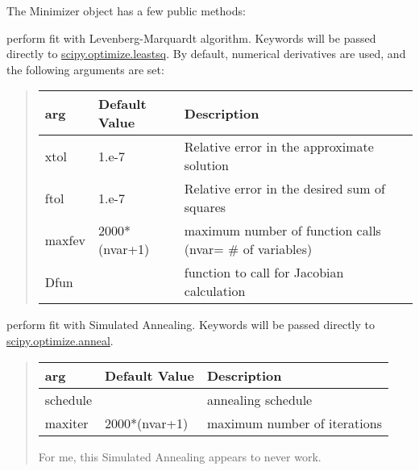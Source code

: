 \documentclass[letterpaper,10pt,english]{sphinxmanual}
\begin{document}
The Minimizer object has a few public methods:

\begin{fulllineitems}
\label{fitting:leastsq}
perform fit with Levenberg-Marquardt algorithm.  Keywords will be passed directly to
\href{http://docs.scipy.org/doc/scipy/reference/generated/scipy.optimize.leastsq.html}{scipy.optimize.leastsq}.
By default, numerical derivatives are used, and the following arguments are set:
\begin{quote}

\begin{tabulary}{\linewidth}{|L|L|L|}
\hline
\textbf{
{\hyperref[fitting:leastsq]{}}
arg
} & \textbf{
Default Value
} & \textbf{
Description
}\\\hline

xtol
 & 
1.e-7
 & 
Relative error in the approximate solution
\\\hline

ftol
 & 
1.e-7
 & 
Relative error in the desired sum of squares
\\\hline

maxfev
 & 
2000*(nvar+1)
 & 
maximum number of function calls (nvar= \# of variables)
\\\hline

Dfun
 & 
 & 
function to call for Jacobian calculation
\\\hline
\end{tabulary}

\end{quote}

\end{fulllineitems}


\begin{fulllineitems}
\label{fitting:anneal}
perform fit with Simulated Annealing.  Keywords will be passed directly to
\href{http://docs.scipy.org/doc/scipy/reference/generated/scipy.optimize.anneal.html}{scipy.optimize.anneal}.
\begin{quote}

\begin{tabulary}{\linewidth}{|L|L|L|}
\hline
\textbf{
{\hyperref[fitting:anneal]{}}
arg
} & \textbf{
Default Value
} & \textbf{
Description
}\\\hline

schedule
 & 
 & 
annealing schedule
\\\hline

maxiter
 & 
2000*(nvar+1)
 & 
maximum number of iterations
\\\hline
\end{tabulary}


For me, this Simulated Annealing appears to never work.
\end{quote}

\end{fulllineitems}
\end{document}
